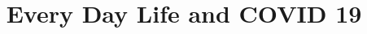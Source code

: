 \documentclass[onecolumn,journal]{IEEEtran}
\begin{document}
\title{\color{Brown} Every Day Life and COVID 19\\
\vspace{-0.35ex}}


   

    
\maketitle


\flushbottom %



\thispagestyle{empty} %




\renewcommand{\thefootnote}{\fnsymbol{footnote}}
\end{document}
